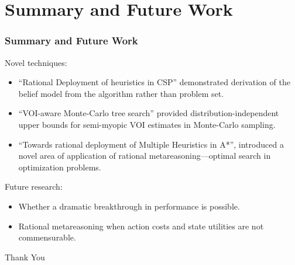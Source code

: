 \documentclass{beamer}
\begin{document}
\section{Summary and Future Work}
\begin{frame}
\frametitle{Summary and Future Work}

Novel techniques:
\begin{itemize}
\item ``Rational Deployment of heuristics in CSP'' demonstrated
  derivation of the belief model from the algorithm rather than
  problem set.
\item ``VOI-aware Monte-Carlo tree search''
provided distribution-independent upper bounds for semi-myopic VOI
estimates in Monte-Carlo sampling.
\item ``Towards rational deployment of Multiple
Heuristics in A*'', introduced a novel area of application of rational
metareasoning---optimal search in optimization problems.
\end{itemize}

Future research:
\begin{itemize}
\item Whether a dramatic breakthrough in performance is possible.
\item Rational metareasoning when action costs and state utilities are
  not commensurable.
\end{itemize}

\end{frame}

\begin{frame}
\begin{center}
\begin{huge}
Thank You
\end{huge}
\end{center}
\end{frame}
\end{document}
